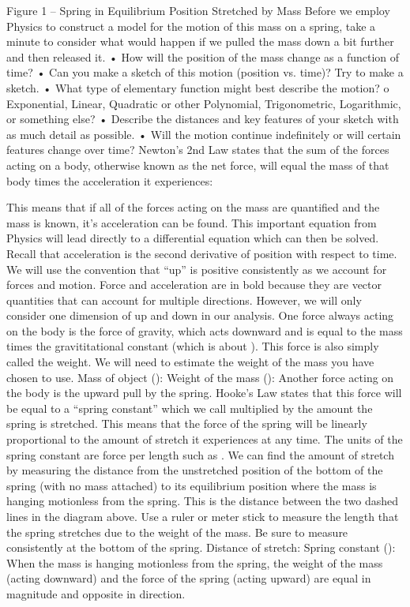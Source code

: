 \documentclass{ximera}
\begin{document}
Figure 1 – Spring in Equilibrium Position Stretched by Mass
Before we employ Physics to construct a model for the motion of this mass on a spring, take a minute to consider what would happen if we pulled the mass down a bit further and then released it.  
•	How will the position of the mass change as a function of time?  
•	Can you make a sketch of this motion (position vs. time)?  Try to make a sketch.
•	What type of elementary function might best describe the motion?  
o	Exponential, Linear, Quadratic or other Polynomial, Trigonometric, Logarithmic, or something else?
•	Describe the distances and key features of your sketch with as much detail as possible.
•	Will the motion continue indefinitely or will certain features change over time?
Newton’s 2nd Law states that the sum of the forces acting on a body, otherwise known as the net force, will equal the mass of that body times the acceleration it experiences:

This means that if all of the forces acting on the mass are quantified and the mass is known, it’s acceleration can be found.  This important equation from Physics will lead directly to a differential equation which can then be solved.  Recall that acceleration is the second derivative of position with respect to time.  We will use the convention that “up” is positive consistently as we account for forces and motion.  Force and acceleration are in bold because they are vector quantities that can account for multiple directions.  However, we will only consider one dimension of up and down in our analysis.  
One force always acting on the body is the force of gravity, which acts downward and is equal to the mass  times the gravititational constant  (which is about ).  This force is also simply called the weight.  We will need to estimate the weight of the mass you have chosen to use.    
Mass of object ():
Weight of the mass (): 
Another force acting on the body is the upward pull by the spring.  Hooke’s Law states that this force will be equal to a “spring constant” which we call  multiplied by the amount the spring is stretched.  This means that the force of the spring will be linearly proportional to the amount of stretch it experiences at any time.  The units of the spring constant are force per length such as .  We can find the amount of stretch by measuring the distance from the unstretched position of the bottom of the spring (with no mass attached) to its equilibrium position where the mass is hanging motionless from the spring.  This is the distance between the two dashed lines in the diagram above.  Use a ruler or meter stick to measure the length that the spring stretches due to the weight of the mass.  Be sure to measure consistently at the bottom of the spring.
Distance of stretch: 
Spring constant ():  
When the mass is hanging motionless from the spring, the weight of the mass (acting downward) and the force of the spring (acting upward) are equal in magnitude and opposite in direction.  
	
\end{document}
